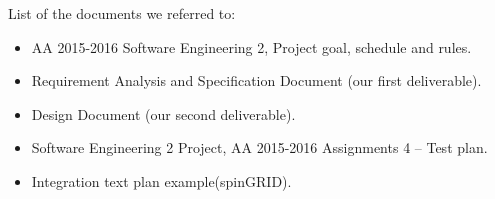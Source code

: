 List of the documents we referred to:
\begin{itemize}
    \item AA 2015-2016 Software Engineering 2, Project goal, schedule and rules.
    \item Requirement Analysis and Specification Document (our first deliverable).
    \item Design Document (our second deliverable).
    \item Software Engineering 2 Project, AA 2015-2016 Assignments 4 – Test plan.
    \item Integration text plan example(spinGRID).
\end{itemize}
